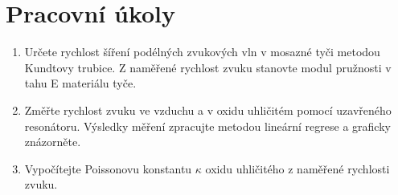 \documentclass[a4paper]{article}
\author{Vladislav Wohlrath}
\begin{document}
%

\section*{Pracovní úkoly}
\begin{enumerate}
\item Určete rychlost šíření podélných zvukových vln v mosazné tyči metodou Kundtovy trubice. Z naměřené rychlost zvuku stanovte modul pružnosti v tahu E materiálu tyče.
\item Změřte rychlost zvuku ve vzduchu a v oxidu uhličitém pomocí uzavřeného resonátoru. Výsledky měření zpracujte metodou lineární regrese a graficky znázorněte.
\item Vypočítejte Poissonovu konstantu $\kappa$ oxidu uhličitého z naměřené rychlosti zvuku.
\end{enumerate}












\printbibliography[title={Seznam použité literatury}]
\end{document}
